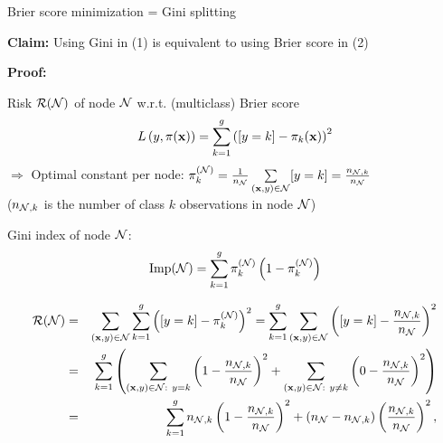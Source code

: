 \documentclass[11pt,compress,t,notes=noshow, xcolor=table]{beamer}
\begin{document}
\begin{vbframe}{Brier score minimization = Gini splitting}

\textbf{Claim:} Using Gini in (1) 
    is equivalent to using Brier score in (2) %
    

\textbf{Proof:} %

Risk $\mathcal{R}(\mathcal{N})$ of node $\mathcal{N}$ w.r.t. (multiclass) Brier score
$$
  L\left(y, \pi(\mathbf{x})\right) = \sum_{k = 1}^g \left([y = k] - \pi_k(\mathbf{x})\right)^2
$$
$\Rightarrow$ Optimal constant per node: $\pi_k^{(\mathcal{N})} = \frac{1}{n_{\mathcal{N}}} \sum\limits_{(\mathbf{x},y) \in \mathcal{N}} [y = k] = \frac{n_{\mathcal{N},k}}{n_{\mathcal{N} }}$ \\ ($n_{\mathcal{N},k}$ is the number of class $k$ observations in node $\mathcal{N}$) \\

\lz

Gini index of node $\mathcal{N}$:
$$
\text{Imp}(\Np) = \sum_{k=1}^g \pikN \left(1-\pikN \right) %
$$


\begin{footnotesize}



\framebreak

\begin{eqnarray*}
\mathcal{R}(\mathcal{N}) &=& \sum_{(\mathbf{x}, y) \in \mathcal{N}}  \sum_{k = 1}^g \left([y = k] - \pi_k^{(\mathcal{N})}\right)^2 
= \sum_{k = 1}^g \sum_{(\mathbf{x}, y) \in \mathcal{N}} \left([y = k] - \frac{n_{\mathcal{N},k}}{n_{\mathcal{N} }}\right)^2\\
&=& \sum_{k = 1}^{g} \left(\sum_{(\mathbf{x}, y) \in \mathcal{N}: ~ y = k} \left(1 - \frac{n_{\mathcal{N},k}}{n_{\mathcal{N} }}\right)^2 + \sum_{(\mathbf{x}, y) \in \mathcal{N}: ~ y \ne k} \left(0 - \frac{n_{\mathcal{N},k}}{n_{\mathcal{N} }}\right)^2\right) \\
&=& \sum_{k = 1}^g n_{\mathcal{N},k}\left(1 - \frac{n_{\mathcal{N},k}}{n_{\mathcal{N} }}\right)^2 + (n_{\mathcal{N} } - n_{\mathcal{N},k})\left(\frac{n_{\mathcal{N},k}}{n_{\mathcal{N} }}\right)^2, 
\end{eqnarray*}


\end{footnotesize}
\end{vbframe}
\end{document}
